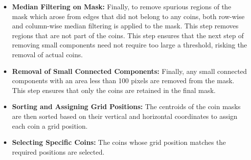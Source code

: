 \documentclass[11pt]{article}
\begin{document}
\begin{itemize}
\item \textbf{Median Filtering on Mask:} Finally, to remove spurious regions of the mask which arose from edges that did not belong to any coins, both row-wise and column-wise median filtering is applied to the mask. This step removes regions that are not part of the coins. This step ensures that the next step of removing small components need not require too large a threshold, risking the removal of actual coins.
\item \textbf{Removal of Small Connected Components:} Finally, any small connected components with an area less than 100 pixels are removed from the mask. This step ensures that only the coins are retained in the final mask.
\item \textbf{Sorting and Assigning Grid Positions:} The centroids of the coin masks are then sorted based on their vertical and horizontal coordinates to assign each coin a grid position. 
\item \textbf{Selecting Specific Coins:} The coins whose grid position matches the required positions are selected.

\end{itemize}
\end{document}
